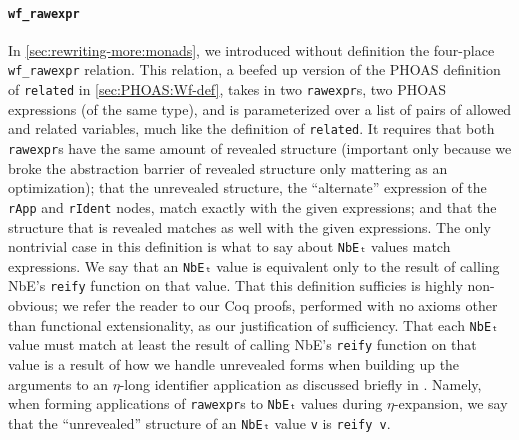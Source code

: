 \paragraph{\texorpdfstring{\texttt{wf_rawexpr}}{wf\_rawexpr}}
In \autoref{sec:rewriting-more:monads}, we introduced without definition the four-place \texttt{wf_rawexpr} relation.
This relation, a beefed up version of the PHOAS definition of \texttt{related} in \autoref{sec:PHOAS:Wf-def}, takes in two \texttt{rawexpr}s, two PHOAS expressions (of the same type), and is parameterized over a list of pairs of allowed and related variables, much like the definition of \texttt{related}.
It requires that both \texttt{rawexpr}s have the same amount of revealed structure (important only because we broke the abstraction barrier of revealed structure only mattering as an optimization); that the unrevealed structure, the ``alternate'' expression of the \texttt{rApp} and \texttt{rIdent} nodes, match exactly with the given expressions; and that the structure that is revealed matches as well with the given expressions.
The only nontrivial case in this definition is what to say about \texttt{NbEₜ} values match expressions.
We say that an \texttt{NbEₜ} value is equivalent only to the result of calling NbE's \texttt{reify} function on that value.
That this definition sufficies is highly non-obvious; we refer the reader to our Coq proofs, performed with no axioms other than functional extensionality, as our justification of sufficiency.
That each \texttt{NbEₜ} value must match at least the result of calling NbE's \texttt{reify} function on that value is a result of how we handle unrevealed forms when building up the arguments to an $\eta$-long identifier application as discussed briefly in .
Namely, when forming applications of \texttt{rawexpr}s to \texttt{NbEₜ} values during $\eta$-expansion, we say that the ``unrevealed'' structure of an \texttt{NbEₜ} value \texttt{v} is \texttt{reify v}.

